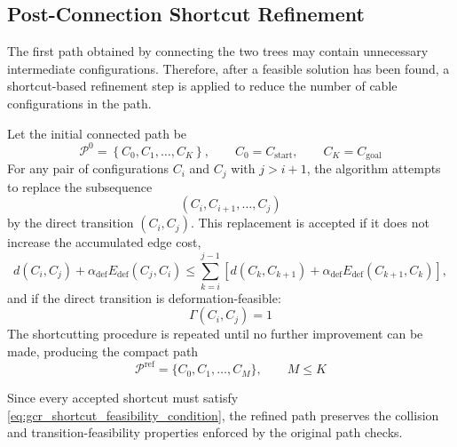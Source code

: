 \documentclass{pas}
\begin{document}
\subsection{Post-Connection Shortcut Refinement}
\label{subsec:gcr_shortcut_refinement}

The first path obtained by connecting the two trees may contain unnecessary intermediate configurations. Therefore, after a feasible solution has been found, a shortcut-based refinement step is applied to reduce the number of cable configurations in the path.

Let the initial connected path be
\begin{equation}
\mathcal{P}^{0}
=
\left\{
C_0,C_1,\ldots,C_K
\right\},
\qquad
C_0=C_{\mathrm{start}},
\qquad
C_K=C_{\mathrm{goal}}
\label{eq:gcr_initial_solution_path}
\end{equation}
For any pair of configurations $C_i$ and $C_j$ with $j>i+1$, the algorithm attempts to replace the subsequence
\begin{equation}
\left(
C_i,C_{i+1},\ldots,C_j
\right)
\label{eq:gcr_shortcut_subsequence}
\end{equation}
by the direct transition $(C_i,C_j)$. This replacement is accepted if it does not increase the accumulated edge cost,
\begin{equation}
d(C_i,C_j)
+
\alpha_{\mathrm{def}}E_{\mathrm{def}}(C_j,C_i)
\leq
\sum_{k=i}^{j-1}
\left[
d(C_k,C_{k+1})
+
\alpha_{\mathrm{def}}E_{\mathrm{def}}(C_{k+1},C_k)
\right],
\label{eq:gcr_shortcut_cost_condition}
\end{equation}
and if the direct transition is deformation-feasible:
\begin{equation}
\Gamma(C_i,C_j)=1
\label{eq:gcr_shortcut_feasibility_condition}
\end{equation}
The shortcutting procedure is repeated until no further improvement can be made, producing the compact path
\begin{equation}
    \mathcal{P}^{\mathrm{ref}}
=
\{C_0,C_1,\ldots,C_M\},
\qquad
M\leq K 
\label{eq:refinedpath}
\end{equation}

Since every accepted shortcut must satisfy \eqref{eq:gcr_shortcut_feasibility_condition}, the refined path preserves the collision and transition-feasibility properties enforced by the original path checks.
\end{document}
